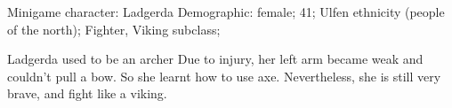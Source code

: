 Minigame character:
Ladgerda
  Demographic: female; 41; Ulfen ethnicity (people of the north); Fighter, Viking subclass;

  Ladgerda used to be an archer Due to injury, her left arm became weak and couldn't pull a bow. So she learnt how to use axe. Nevertheless, she is still very brave, and fight like a viking.
